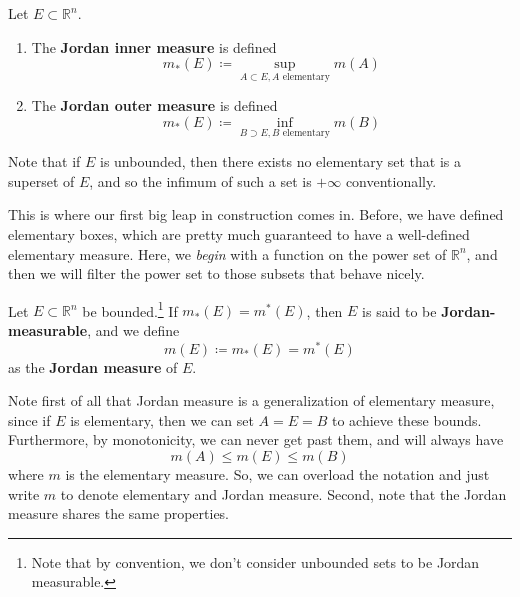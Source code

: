   \begin{definition}
    Let $E \subset \mathbb{R}^n$. 
    \begin{enumerate}
      \item The \textbf{Jordan inner measure} is defined 
      \begin{equation}
        m_\ast (E) \coloneqq \sup_{A \subset E, A \text{ elementary}} m(A)
      \end{equation}

      \item The \textbf{Jordan outer measure} is defined 
      \begin{equation}
        m_\ast (E) \coloneqq \inf_{B \supset E, B \text{ elementary}} m(B)
      \end{equation}
    \end{enumerate}
    Note that if $E$ is unbounded, then there exists no elementary set that is a superset of $E$, and so the infimum of such a set is $+\infty$ conventionally. 
  \end{definition}

  This is where our first big leap in construction comes in. Before, we have defined elementary boxes, which are pretty much guaranteed to have a well-defined elementary measure. Here, we \textit{begin} with a function on the power set of $\mathbb{R}^n$, and then we will filter the power set to those subsets that behave nicely. 

  \begin{definition}
    Let $E \subset \mathbb{R}^n$ be bounded.\footnote{Note that by convention, we don't consider unbounded sets to be Jordan measurable.} If $m_\ast (E) = m^\ast (E)$, then $E$ is said to be \textbf{Jordan-measurable}, and we define 
    \begin{equation}
      m(E) \coloneqq m_\ast (E) = m^\ast (E)
    \end{equation}
    as the \textbf{Jordan measure} of $E$. 
  \end{definition}

  Note first of all that Jordan measure is a generalization of elementary measure, since if $E$ is elementary, then we can set $A = E = B$ to achieve these bounds. Furthermore, by monotonicity, we can never get past them, and will always have 
  \begin{equation}
    m(A) \leq m(E) \leq m(B)
  \end{equation}
  where $m$ is the elementary measure. So, we can overload the notation and just write $m$ to denote elementary and Jordan measure. Second, note that the Jordan measure shares the same properties. 

